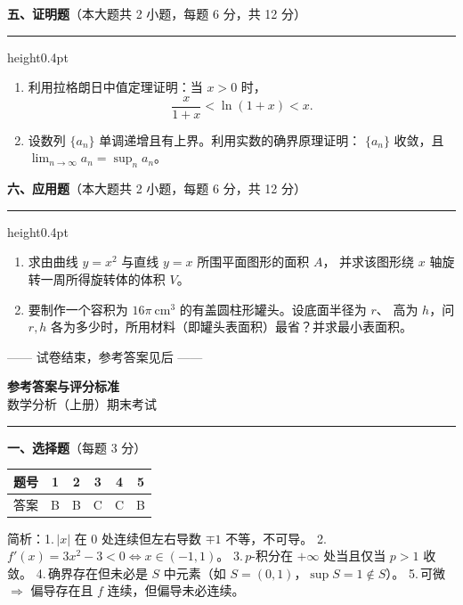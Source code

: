 \documentclass[12pt]{ctexart}
\newcommand{\bigsection}[2]{%
  \vspace{6pt}%
  {\noindent\bfseries\large #1}\hfill{\normalsize（本大题共 #2）}\par
  \vspace{2pt}\hrule height0.4pt\vspace{8pt}}
\theoremstyle{definition}
\begin{document}
\bigsection{五、证明题}{2 小题，每题 6 分，共 12 分}

\begin{enumerate}[label=\arabic*.]
\item 利用拉格朗日中值定理证明：当 $x>0$ 时，
  \[
  \frac{x}{1+x}<\ln(1+x)<x .
  \]

\item 设数列 $\{a_{n}\}$ 单调递增且有上界。利用实数的确界原理证明：
  $\{a_{n}\}$ 收敛，且 $\displaystyle\lim_{n\to\infty}a_{n}=\sup_{n}a_{n}$。
\end{enumerate}

\bigsection{六、应用题}{2 小题，每题 6 分，共 12 分}

\begin{enumerate}[label=\arabic*.]
\item 求由曲线 $y=x^{2}$ 与直线 $y=x$ 所围平面图形的面积 $A$，
  并求该图形绕 $x$ 轴旋转一周所得旋转体的体积 $V$。

\item 要制作一个容积为 $16\pi\ \mathrm{cm}^{3}$ 的有盖圆柱形罐头。设底面半径为 $r$、
  高为 $h$，问 $r,h$ 各为多少时，所用材料（即罐头表面积）最省？并求最小表面积。
\end{enumerate}

\vspace{8pt}
\begin{center}\small —— 试卷结束，参考答案见后 ——\end{center}

\clearpage
\begin{center}
  {\Large\bfseries 参考答案与评分标准}\\[2pt]
  {\small 数学分析（上册）期末考试}
\end{center}
\vspace{6pt}\hrule\vspace{12pt}

\noindent\textbf{一、选择题}（每题 3 分）\par\vspace{4pt}
\begin{center}
\renewcommand{\arraystretch}{1.3}
\begin{tabular}{|c|c|c|c|c|c|}
\hline
题号 & 1 & 2 & 3 & 4 & 5 \\\hline
答案 & B & B & C & C & B \\\hline
\end{tabular}
\end{center}
\noindent\small 简析：1.\,$|x|$ 在 $0$ 处连续但左右导数 $\mp1$ 不等，不可导。
2.\,$f'(x)=3x^{2}-3<0\Leftrightarrow x\in(-1,1)$。
3.\,$p$-积分在 $+\infty$ 处当且仅当 $p>1$ 收敛。
4.\,确界存在但未必是 $S$ 中元素（如 $S=(0,1)$，$\sup S=1\notin S$）。
5.\,可微 $\Rightarrow$ 偏导存在且 $f$ 连续，但偏导未必连续。\normalsize
\end{document}

